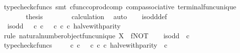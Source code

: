 \begin{isabellebody}
\ {\isacharparenleft}{\kern0pt}typecheck{\isacharunderscore}{\kern0pt}cfuncs{\isacharcomma}{\kern0pt}\ smt\ cfunc{\isacharunderscore}{\kern0pt}coprod{\isacharunderscore}{\kern0pt}comp\ comp{\isacharunderscore}{\kern0pt}associative{}\ terminal{\isacharunderscore}{\kern0pt}func{\isacharunderscore}{\kern0pt}unique{\isacharparenright}{\kern0pt}\isanewline
\ \ \ \ \isamarkupfalse%
\ \isamarkupfalse%
\ {\isacharquery}{\kern0pt}thesis\isanewline
\ \ \ \ \ \ \isamarkupfalse%
\ calculation\ \isamarkupfalse%
\ auto\isanewline
\ \ \isamarkupfalse%
\isanewline
{}\isamarkupfalse%
%
\endisatagproof
{\isafoldproof}%
%
\isadelimproof
\isanewline
%
\endisadelimproof
\isanewline
{}\isamarkupfalse%
\ is{\isacharunderscore}{\kern0pt}odd{\isacharunderscore}{\kern0pt}def{}{\isacharcolon}{\kern0pt}\isanewline
\ \ {\isachardoublequoteopen}is{\isacharunderscore}{\kern0pt}odd\ {\isacharequal}{\kern0pt}\ {\isacharparenleft}{\kern0pt}{\isacharparenleft}{\kern0pt}{\isasymf}\ {\isasymcirc}\isactrlsub c\ {\isasymbeta}\isactrlbsub {\isasymnat}\isactrlsub c\isactrlesub {\isacharparenright}{\kern0pt}\ {\isasymamalg}\ {\isacharparenleft}{\kern0pt}{\isasymt}\ {\isasymcirc}\isactrlsub c\ {\isasymbeta}\isactrlbsub {\isasymnat}\isactrlsub c\isactrlesub {\isacharparenright}{\kern0pt}{\isacharparenright}{\kern0pt}\ {\isasymcirc}\isactrlsub c\ halve{\isacharunderscore}{\kern0pt}with{\isacharunderscore}{\kern0pt}parity{\isachardoublequoteclose}\isanewline
%
\isadelimproof
%
\endisadelimproof
%
\isatagproof
{}\isamarkupfalse%
\ {\isacharparenleft}{\kern0pt}rule\ natural{\isacharunderscore}{\kern0pt}number{\isacharunderscore}{\kern0pt}object{\isacharunderscore}{\kern0pt}func{\isacharunderscore}{\kern0pt}unique{\isacharbrackleft}{\kern0pt}\ X{\isacharequal}{\kern0pt}{\isasymOmega}{\isacharcomma}{\kern0pt}\ \ f{\isacharequal}{\kern0pt}NOT{\isacharbrackright}{\kern0pt}{\isacharparenright}{\kern0pt}\isanewline
\ \ \isamarkupfalse%
\ {\isachardoublequoteopen}is{\isacharunderscore}{\kern0pt}odd\ {\isacharcolon}{\kern0pt}\ {\isasymnat}\isactrlsub c\ {\isasymrightarrow}\ {\isasymOmega}{\isachardoublequoteclose}\isanewline
\ \ \ \ \isamarkupfalse%
\ typecheck{\isacharunderscore}{\kern0pt}cfuncs\isanewline
\ \ \isamarkupfalse%
\ {\isachardoublequoteopen}{\isacharparenleft}{\kern0pt}{\isasymf}\ {\isasymcirc}\isactrlsub c\ {\isasymbeta}\isactrlbsub {\isasymnat}\isactrlsub c\isactrlesub {\isacharparenright}{\kern0pt}\ {\isasymamalg}\ {\isacharparenleft}{\kern0pt}{\isasymt}\ {\isasymcirc}\isactrlsub c\ {\isasymbeta}\isactrlbsub {\isasymnat}\isactrlsub c\isactrlesub {\isacharparenright}{\kern0pt}\ {\isasymcirc}\isactrlsub c\ halve{\isacharunderscore}{\kern0pt}with{\isacharunderscore}{\kern0pt}parity\ {\isacharcolon}{\kern0pt}\ {\isasymnat}\isactrlsub c\ {\isasymrightarrow}\ {\isasymOmega}{\isachardoublequoteclose}\isanewline

\end{isabellebody}
